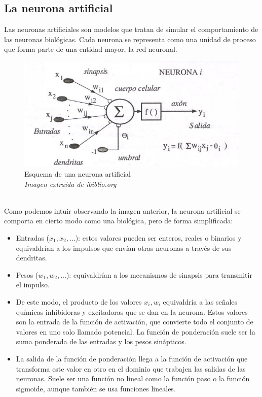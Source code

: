 \subsection {La neurona artificial} \mbox{}
Las neuronas artificiales son modelos que tratan de simular el comportamiento de las neuronas biológicas. Cada neurona se representa como una unidad de proceso que forma parte de una entidad mayor, la red neuronal.
\begin{figure}[htp]
\centering
\includegraphics[scale=1]{images/neuronaartificial.jpg}
\caption{Esquema de una neurona artificial\\\textit{Imagen extraída de ibiblio.org}}
\end{figure}\\
Como podemos intuir observando la imagen anterior, la neurona artificial se comporta en cierto modo como una biológica, pero de forma simplificada:
\begin{itemize}
\item Entradas (${x_{1}, x_{2}, ...}$): estos valores pueden ser enteros, reales o binarios y equivaldrían a los impulsos que envían otras neuronas a través de sus dendritas.
\item Pesos (${w_{1}, w_{2}, ...}$): equivaldrían a los mecanismos de sinapsis para transmitir el impulso.
\item De este modo, el producto de los valores ${x_{i} , w_{i}}$ equivaldría a las señales químicas inhibidoras y excitadoras que se dan en la neurona. Estos valores son la entrada de la función de activación, que convierte todo el conjunto de valores en uno solo llamado potencial. La función de ponderación suele ser la suma ponderada de las entradas y los pesos sinápticos.
\item La salida de la función de ponderación llega a la función de activación que transforma este valor en otro en el dominio que trabajen las salidas de las neuronas. Suele ser una función no lineal como la función paso o la función sigmoide, aunque también se usa funciones lineales.
\end{itemize}
